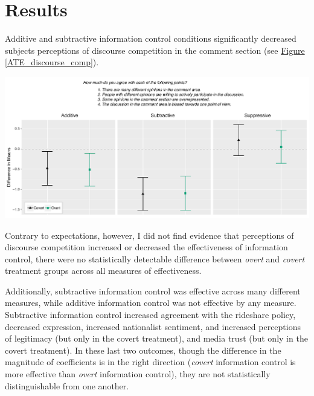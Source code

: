 \documentclass[11pt]{article}
\begin{document}
\section{Results}

Additive and subtractive information control conditions significantly decreased subjects perceptions of discourse competition in the comment section (see \hyperref[ATE_discourse_comp]{Figure \ref*{ATE_discourse_comp}}).

\vspace{-2em}
\begin{minipage}{\linewidth}
    \begin{center}
        \includegraphics[width=.9\textwidth]{figures/ATE_discourse_comp.pdf}\\
        \label{ATE_discourse_comp}
    \end{center}
    \vspace{.5em}
\end{minipage}

Contrary to expectations, however, I did not find evidence that perceptions of discourse competition increased or decreased the effectiveness of information control, there were no statistically detectable difference between {\it overt} and {\it covert} treatment groups across all measures of effectiveness.

Additionally, subtractive information control was effective across many different measures, while additive information control was not effective by any measure. Subtractive information control increased agreement with the rideshare policy, decreased expression, increased nationalist sentiment, and increased perceptions of legitimacy (but only in the covert treatment), and media trust (but only in the covert treatment). In these last two outcomes, though the difference in the magnitude of coefficients is in the right direction ({\it covert} information control is more effective than {\it overt} information control), they are not statistically distinguishable from one another.
\end{document}
